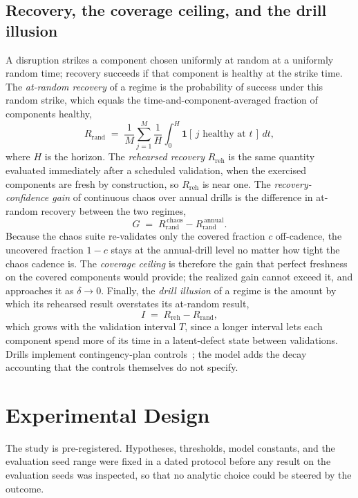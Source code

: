 \documentclass[journal]{IEEEtran}
\begin{document}
\subsection{Recovery, the coverage ceiling, and the drill illusion}
A disruption strikes a component chosen uniformly at random at a uniformly random time; recovery
succeeds if that component is healthy at the strike time. The \emph{at-random recovery} of a regime
is the probability of success under this random strike, which equals the time-and-component-averaged
fraction of components healthy,
\begin{equation}
\label{eq:atrandom}
R_{\mathrm{rand}} \;=\; \frac{1}{M}\sum_{j=1}^{M} \frac{1}{H}\int_{0}^{H} \mathbf{1}\!\left[\,j \text{ healthy at } t\,\right]\, dt,
\end{equation}
where $H$ is the horizon. The \emph{rehearsed recovery} $R_{\mathrm{reh}}$ is the same quantity
evaluated immediately after a scheduled validation, when the exercised components are fresh by
construction, so $R_{\mathrm{reh}}$ is near one. The \emph{recovery-confidence gain} of continuous
chaos over annual drills is the difference in at-random recovery between the two regimes,
\begin{equation}
\label{eq:gain}
G \;=\; R_{\mathrm{rand}}^{\,\mathrm{chaos}} - R_{\mathrm{rand}}^{\,\mathrm{annual}}.
\end{equation}
Because the chaos suite re-validates only the covered fraction $c$ off-cadence, the uncovered
fraction $1-c$ stays at the annual-drill level no matter how tight the chaos cadence is. The
\emph{coverage ceiling} is therefore the gain that perfect freshness on the covered components would
provide; the realized gain cannot exceed it, and approaches it as $\delta \to 0$. Finally, the
\emph{drill illusion} of a regime is the amount by which its rehearsed result overstates its
at-random result,
\begin{equation}
\label{eq:illusion}
I \;=\; R_{\mathrm{reh}} - R_{\mathrm{rand}},
\end{equation}
which grows with the validation interval $T$, since a longer interval lets each component spend more
of its time in a latent-defect state between validations. Drills implement contingency-plan
controls~\cite{nist80053}; the model adds the decay accounting that the controls themselves do not
specify.

\section{Experimental Design}
The study is pre-registered. Hypotheses, thresholds, model constants, and the evaluation seed range
were fixed in a dated protocol before any result on the evaluation seeds was inspected, so that no
analytic choice could be steered by the outcome.
\end{document}
